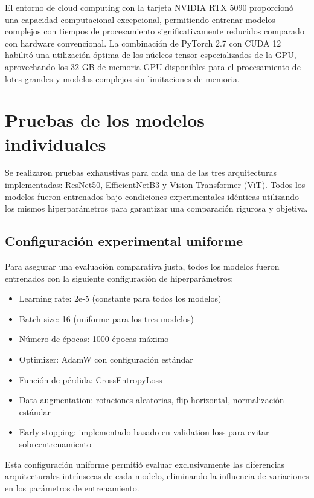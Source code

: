 El entorno de cloud computing con la tarjeta NVIDIA RTX 5090 proporcionó una capacidad computacional excepcional, permitiendo entrenar modelos complejos con tiempos de procesamiento significativamente reducidos comparado con hardware convencional. La combinación de PyTorch 2.7 con CUDA 12 habilitó una utilización óptima de los núcleos tensor especializados de la GPU, aprovechando los 32 GB de memoria GPU disponibles para el procesamiento de lotes grandes y modelos complejos sin limitaciones de memoria.

\section{Pruebas de los modelos individuales}

Se realizaron pruebas exhaustivas para cada una de las tres arquitecturas implementadas: ResNet50, EfficientNetB3 y Vision Transformer (ViT). Todos los modelos fueron entrenados bajo condiciones experimentales idénticas utilizando los mismos hiperparámetros para garantizar una comparación rigurosa y objetiva.

\subsection{Configuración experimental uniforme}

Para asegurar una evaluación comparativa justa, todos los modelos fueron entrenados con la siguiente configuración de hiperparámetros:

\begin{itemize}
\item Learning rate: 2e-5 (constante para todos los modelos)
\item Batch size: 16 (uniforme para los tres modelos)
\item Número de épocas: 1000 épocas máximo
\item Optimizer: AdamW con configuración estándar
\item Función de pérdida: CrossEntropyLoss
\item Data augmentation: rotaciones aleatorias, flip horizontal, normalización estándar
\item Early stopping: implementado basado en validation loss para evitar sobreentrenamiento
\end{itemize}

Esta configuración uniforme permitió evaluar exclusivamente las diferencias arquitecturales intrínsecas de cada modelo, eliminando la influencia de variaciones en los parámetros de entrenamiento.


